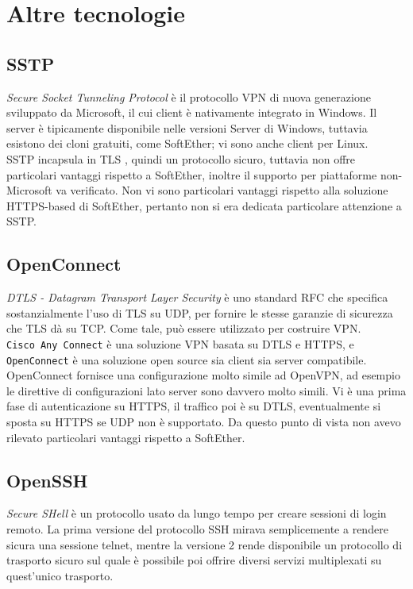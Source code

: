 \section{Altre tecnologie}
\subsection{SSTP}
\textit{Secure Socket Tunneling Protocol} è il protocollo VPN di nuova generazione sviluppato
da Microsoft, il cui client è nativamente integrato in Windows. Il server è tipicamente
disponibile nelle versioni Server di Windows, tuttavia esistono dei cloni gratuiti, come
SoftEther; vi sono anche client per Linux.\\
SSTP incapsula in TLS , quindi un protocollo
sicuro, tuttavia non offre particolari vantaggi rispetto a SoftEther, inoltre il supporto
per piattaforme non-Microsoft va verificato. Non vi sono particolari vantaggi rispetto
alla soluzione HTTPS-based di SoftEther, pertanto non si era dedicata particolare
attenzione a SSTP.

\subsection{OpenConnect}
\textit{DTLS - Datagram Transport Layer Security} è uno standard RFC che specifica
sostanzialmente l'uso di TLS su UDP, per fornire le stesse garanzie di sicurezza che TLS dà
su TCP. Come tale, può essere utilizzato per costruire VPN.\\
\texttt{Cisco Any Connect} è una soluzione VPN basata su DTLS e HTTPS, e
\texttt{OpenConnect} è una soluzione open source sia client sia server compatibile.
OpenConnect fornisce una configurazione molto simile ad OpenVPN, ad esempio le direttive
di configurazioni lato server sono davvero molto simili. Vi è una prima fase di
autenticazione su HTTPS, il traffico poi è su DTLS, eventualmente si sposta su
HTTPS se UDP non è supportato. Da questo punto di vista non avevo rilevato particolari
vantaggi rispetto a SoftEther.


\subsection{OpenSSH}
\textit{Secure SHell} è un protocollo usato da lungo tempo per creare sessioni di login remoto.
La prima versione del protocollo SSH mirava semplicemente a rendere sicura una
sessione telnet, mentre la versione 2 rende disponibile un protocollo di trasporto
sicuro sul quale è possibile poi offrire diversi servizi multiplexati su quest'unico
trasporto.

